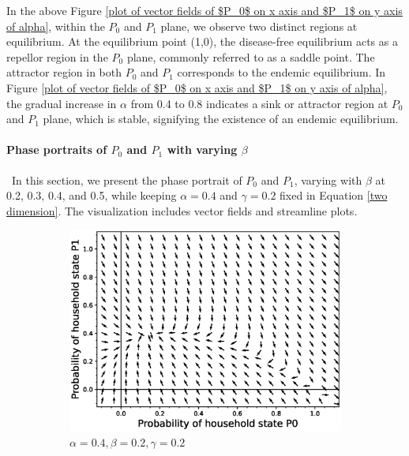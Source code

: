 \documentclass[paper=a4, fontsize=11pt, twoside, BCOR=12mm, parskip=full, listof=totoc]{scrreprt}
\begin{document}
{In the above Figure \ref{plot of vector fields of $P_0$ on x axis and $P_1$ on y axis of alpha}, within the \(P_0\) and \(P_1\) plane, we observe two distinct regions at equilibrium. At the equilibrium point (1,0), the disease-free equilibrium acts as a repellor region in the \(P_0\) plane, commonly referred to as a saddle point. The attractor region in both \(P_0\) and \(P_1\) corresponds to the endemic equilibrium. In Figure \ref{plot of vector fields of $P_0$ on x axis and $P_1$ on y axis of alpha}, the gradual increase in \(\alpha\) from 0.4 to 0.8 indicates a sink or attractor region at $P_0$ and $P_1$ plane, which is stable, signifying the existence of an endemic equilibrium. 

\paragraph*{Phase portraits of $P_0$ and $P_1$ with varying $\beta$}\
In this section, we present the phase portrait of \(P_0\) and \(P_1\), varying with \(\beta\) at 0.2, 0.3, 0.4, and 0.5, while keeping \(\alpha = 0.4\) and \(\gamma = 0.2\) fixed in Equation \ref{two dimension}. The visualization includes vector fields and streamline plots.
\begin{figure}[H]
	\centering
	\begin{subfigure}[b]{0.4\linewidth}
	  \includegraphics[width=\linewidth]{phase_portrait/01g1.eps}
	  \caption{\(\alpha=0.4, \beta=0.2, \gamma=0.2\)}
	  \label{beta two phasevectorfield}
	\end{subfigure}
    \begin{subfigure}[b]{0.4\linewidth}

\end{subfigure}
\end{figure}}
\end{document}
